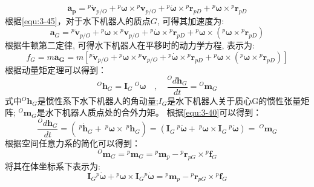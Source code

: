 \begin{equation}
    \label{equ:3-45}
    \boldsymbol{a_{{p}}}={}^{{p}}\dot{\boldsymbol{v}}_{{p/O}}
    +{}^{{p}}\boldsymbol{\omega}\times{}^{{p}}\boldsymbol{v}_{{p/O}}
    +{}^{{p}}\dot{\boldsymbol{\omega}}\times{}^{{p}}\boldsymbol{r}_{{pD}}
    +{}^{{p}}\boldsymbol{\omega}\times{}^{{p}}\boldsymbol{r}_{{pD}} 
\end{equation}
根据\autoref{equ:3-45}，对于水下机器人的质点$ G$, 可得其加速度为:
\begin{equation}
    \boldsymbol{a}_G={}^{{p}}\dot{\boldsymbol{v}}_{{p/O}}
    +{}^{{p}}\boldsymbol{\omega}\times{}^{{p}}\boldsymbol{v}_{{p/O}}+{}^{{p}}\dot{\boldsymbol{\omega}}\times{}^{{p}}\boldsymbol{r}_{{pD}}
    +{}^{{p}}\boldsymbol{\omega}\times({}^{{p}}\boldsymbol{\omega}\times{}^{{p}}\boldsymbol{r}_{{pD}})
\end{equation}
根据牛顿第二定律, 可得水下机器人在平移时的动力学方程, 表示为:
\begin{equation}
    f_G=m\boldsymbol{a_G}=m[{}^p\dot{\boldsymbol{v}}_{{p/O}}+{}^p\boldsymbol{\omega}\times{}^p\boldsymbol{v}_{{p/O}}
    +{}^p\dot{\boldsymbol{\omega}}\times{}^p\boldsymbol{r}_{{pD}}+{}^p\boldsymbol{\omega}\times({}^p\boldsymbol{\omega}\times{}^p\boldsymbol{r}_{{pD}})]
\end{equation}
根据动量矩定理可以得到：
\begin{equation}
    ^O\boldsymbol{h}_{G}=\boldsymbol{I}_{G} {~}^O\boldsymbol{\omega}\quad,\quad\frac{{}^Od\boldsymbol{h}_{G}}{dt}={}^O\boldsymbol{m}_{G}
\end{equation}
式中$^O\boldsymbol{h}_{G}$是惯性系下水下机器人的角动量;$I_G$是水下机器人关于质心G的惯性张量矩阵; $^O \boldsymbol{m}_G$是水下机器人质点处的合外力矩。
根据\autoref{equ:3-40}可以得到：
\begin{equation}
    \frac{^{O}d\boldsymbol{h}_{{G}}}{dt}=\left({~}^{{p}}\dot{\boldsymbol{h}}_{{G}}+{~}^{{p}}\boldsymbol{\omega}\times{~}^{{p}}\boldsymbol{h}_{{G}}\right)=\left(\boldsymbol{I}_{{G}}{~}^{{p}}\dot{\boldsymbol{\omega}}
    +{~}^{{p}}\boldsymbol{\omega}\times\boldsymbol{I}_{G}{~}^{{p}}\dot{\boldsymbol{\omega}}\right)={~}^{O}\boldsymbol{m}_{{G}}
\end{equation}
根据空间任意力系的简化可以得到：
\begin{equation}
    ^{O}\boldsymbol{m}_{{G}}={}^{p}\boldsymbol{m}_{{G}}={}^{{p}}\boldsymbol{m}_{{p}}-{}^{{p}}\boldsymbol{r}_{p{G}}\times{}^{{p}}\boldsymbol{f}_{{G}}
\end{equation}
将其在体坐标系下表示为:
\begin{equation}
    \boldsymbol{ I}_{{G}}{}^{{p}}\dot{\boldsymbol{\omega}}
    +{}^{{p}}\boldsymbol{\omega}\times \boldsymbol{I}_{G}{}^{{p}}\dot{\boldsymbol{\omega}}
    ={}^{{p}}\boldsymbol{m}_{{p}}-{}^{{p}}\boldsymbol{r}_{p{G}}\times{}^{{p}}\boldsymbol{f}_{{G}}
\end{equation}
